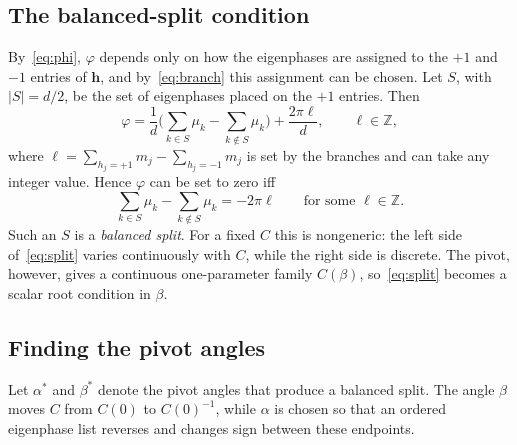 \documentclass[11pt]{article}
\begin{document}
\subsection{The balanced-split condition}\label{sec:cond}

By~\eqref{eq:phi}, $\varphi$ depends only on how the eigenphases are assigned to the $+1$
and $-1$ entries of $\mathbf h$, and by~\eqref{eq:branch} this assignment can be chosen. Let $S$,
with $|S|=d/2$, be the set of eigenphases placed on the $+1$ entries. Then
\begin{equation}\label{eq:phiS}
\varphi=\frac1d\Big(\sum_{k\in S}\mu_k-\sum_{k\notin S}\mu_k\Big)+\frac{2\pi\ell}{d},\qquad
\ell\in\mathbb Z,
\end{equation}
where $\ell=\sum_{h_j=+1}m_j-\sum_{h_j=-1}m_j$ is set by the branches and can take any integer
value. Hence $\varphi$ can
be set to zero iff
\begin{equation}\label{eq:split}
\sum_{k\in S}\mu_k-\sum_{k\notin S}\mu_k=-2\pi\ell\qquad\text{for some }\ell\in\mathbb Z .
\end{equation}
Such an $S$ is a \emph{balanced split}. For a fixed $C$ this is nongeneric: the left side of~\eqref{eq:split}
varies continuously with $C$, while the right side is discrete. The pivot, however, gives a
continuous one-parameter family $C(\beta)$, so~\eqref{eq:split} becomes a scalar root condition
in $\beta$.

\subsection{Finding the pivot angles}\label{sec:exist}

Let $\alpha^{\ast}$ and $\beta^{\ast}$ denote the pivot angles that produce a balanced split. The angle
$\beta$ moves $C$ from $C(0)$ to $C(0)^{-1}$, while $\alpha$ is chosen so that an ordered
eigenphase list reverses and changes sign between these endpoints.
\end{document}
